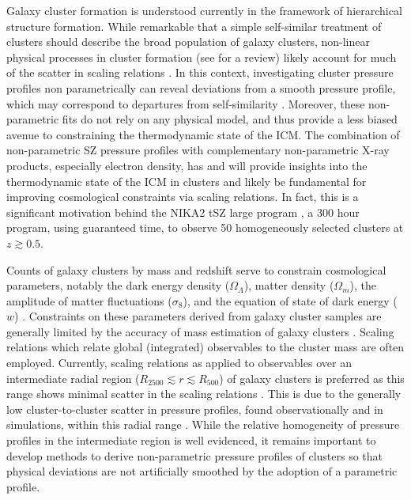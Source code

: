 \documentclass[twocolumn,traditabstract]{aa}
\begin{document}
Galaxy cluster formation is understood currently in the framework of hierarchical structure formation\citep[e.g.][]{press1974}.
While remarkable that a simple self-similar treatment of clusters \citep{kaiser1986} should describe the broad population of
galaxy clusters, non-linear physical processes in cluster formation (see \citet{kravtsov2012} for a review) likely account
for much of the scatter in scaling relations \citep[e.g.][]{battaglia2012}. In this context, investigating cluster pressure profiles
non parametrically can reveal deviations from a smooth pressure profile, which may correspond to departures from self-similarity
\citep{basu2010}. Moreover, these non-parametric fits do not rely on any physical model, and thus provide a less biased avenue
to constraining the thermodynamic state of the ICM. The combination of non-parametric SZ pressure profiles with complementary
non-parametric X-ray products, especially electron density, has \citep[e.g][]{basu2010,planck2013a,ruppin2017}
and will provide insights into the thermodynamic state of the ICM in clusters and likely be fundamental for improving cosmological
constraints via scaling relations. In fact, this is a significant motivation behind the NIKA2 tSZ large program \citep{comis2016},
a 300 hour program, using guaranteed time, to observe 50 homogeneously selected clusters at $z \gtrsim 0.5$.


Counts of galaxy clusters by mass and redshift serve to constrain cosmological parameters, notably the dark energy density
($\Omega_{\Lambda}$), matter density ($\Omega_{m}$), the amplitude of matter fluctuations ($\sigma_8$), and the equation of state of
dark energy ($w$) \citep{planck2016_szc}. Constraints on these
parameters derived from galaxy cluster samples are generally limited by the accuracy of mass estimation of 
galaxy clusters \citep[e.g.][]{hasselfield2013, dehaan2016}. Scaling relations which relate global (integrated) observables
to the cluster mass are often employed. Currently, scaling relations as applied to observables over an intermediate radial
region ($R_{2500} \lesssim r \lesssim R_{500}$) of galaxy clusters is preferred as this range shows minimal scatter in the
scaling relations \citep[e.g.][]{kravtsov2012}. This is due
to the generally low cluster-to-cluster scatter in pressure profiles, found observationally and in simulations,
within this radial range \citep[e.g.][]{borgani2004,nagai2007,arnaud2010,bonamente2012,planck2013a,sayers2013}.
While the relative homogeneity of pressure profiles in the intermediate region is well evidenced, it remains important to
develop methods to derive non-parametric pressure profiles of clusters so that physical deviations are not artificially
smoothed by the adoption of a parametric profile. 
\end{document}
